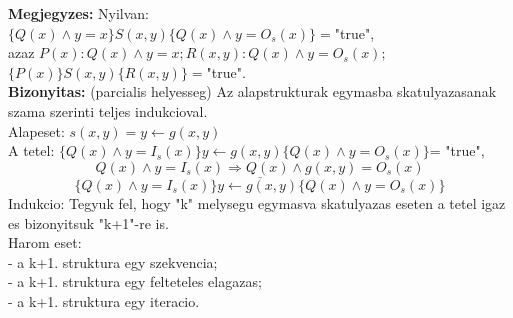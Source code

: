 \documentclass[a4paper,10pt]{article}
\begin{document}
\textbf{Megjegyzes:} Nyilvan:\\
\indent $\lbrace Q(x)\wedge y=x\rbrace S(x,y) \lbrace Q(x)\wedge y=O_s(x)\rbrace=$"true",\\
azaz $P(x):Q(x)\wedge y=x; R(x,y):Q(x) \wedge y=O_s(x)$;\\
$\lbrace P(x)\rbrace S(x,y) \lbrace R(x,y)\rbrace=$"true".\\
\textbf{Bizonyitas:} (parcialis helyesseg) Az alapstrukturak egymasba skatulyazasanak szama szerinti teljes indukcioval.\\
Alapeset: $s(x,y) = y \leftarrow g(x,y)$\\
A tetel: $\lbrace Q(x) \wedge y=I_s(x)\rbrace y \leftarrow g(x,y) \lbrace Q(x) \wedge y=O_s(x)\rbrace$= "true",
$$\underline{Q(x) \wedge y=I_s(x) \Rightarrow Q(x) \wedge g(x,y)=O_s(x)}$$
$$\lbrace Q(x) \wedge y=I_s(x)\rbrace y \leftarrow g(x,y) \lbrace Q(x) \wedge y=O_s(x)\rbrace$$
Indukcio: Tegyuk fel, hogy "k" melysegu egymasva skatulyazas eseten a tetel igaz es bizonyitsuk "k+1"-re is.\\
Harom eset:\\
\indent - a k+1. struktura egy szekvencia;\\
\indent - a k+1. struktura egy felteteles elagazas;\\
\indent - a k+1. struktura egy iteracio.
\end{document}
